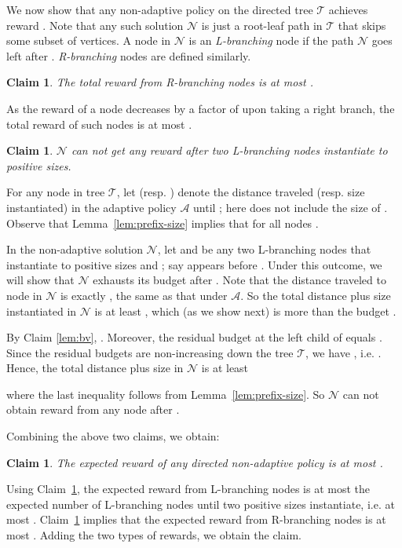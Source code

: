 \documentclass[11pt,letterpaper]{article}
\newtheorem{claim}[theorem]{Claim}
\numberwithin{algorithm}{section}
\newenvironment{proof}{

\noindent{\bf Proof:}}
{\hfill


}
\newcommand{\A}[0]{{\ensuremath{\mathcal{A}}}\xspace}
\newcommand{\N}[0]{{\ensuremath{\mathcal{N}}}\xspace}
\newcommand{\T}{\ensuremath{\mathcal{T}}\xspace}
\begin{document}
We now show that any non-adaptive policy on the directed tree \T achieves reward . Note that any such solution \N is just a root-leaf path in \T that skips some subset of vertices. A node  in \N is an {\em L-branching} node if the path \N goes left after . {\em R-branching} nodes are defined similarly.

\begin{claim}\label{cl:na-Rbranch}
The total reward from R-branching nodes is at most .
\end{claim}
\begin{proof}
As the reward of a node decreases by a factor of  upon taking a right branch,
the total reward of such nodes is at most .
\end{proof}

\begin{claim}\label{cl:na-Lbranch}
\N can not get any reward after two L-branching nodes instantiate to positive sizes.
\end{claim}
\begin{proof}
For any node  in tree \T, let  (resp. ) denote the distance traveled (resp. size instantiated) in the adaptive policy \A until ; here  does not include the size of .  Observe that Lemma~\ref{lem:prefix-size} implies that  for all nodes .

In the non-adaptive solution \N, let  and  be any two L-branching nodes that instantiate to positive sizes  and ; say  appears before . Under this outcome, we will show that \N exhausts its budget after . Note that the distance traveled to node  in \N is exactly , the same as that under \A. So the total distance plus size instantiated in \N is at least , which (as we show next) is more than the budget .

By Claim  \ref{lem:bv},  . Moreover, the residual budget  at the left child  of  equals . Since the residual budgets are non-increasing down the tree \T, we have , i.e. . Hence, the total distance plus size in \N is at least

 where the last inequality follows from Lemma~\ref{lem:prefix-size}. So \N can not obtain reward from any node after .
\end{proof}

Combining the above two claims, we obtain:
\begin{claim}\label{cl:mon-na}
The expected reward of any directed non-adaptive policy is at most .
\end{claim}
\begin{proof}
Using Claim~\ref{cl:na-Lbranch}, the expected reward from L-branching nodes is at most the expected number of L-branching nodes until two positive sizes instantiate, i.e. at most . Claim~\ref{cl:na-Rbranch} implies that the expected reward from R-branching nodes is at most . Adding the two types of rewards, we obtain the claim.
\end{proof}
\end{document}

